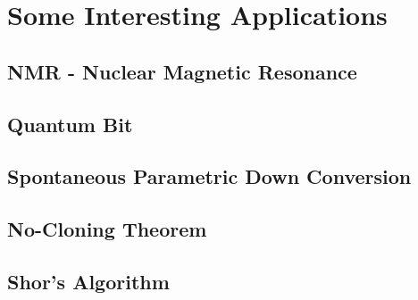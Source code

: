 \documentclass[../../Quantum-Technologies-Notes]{subfiles}
\begin{document}
	
	\ifSubfilesClassLoaded{ \pagestyle{fancy} }{}
	
	\section{Some Interesting Applications}
		
		\subsection{NMR - Nuclear Magnetic Resonance}
		
		\subsection{Quantum Bit}
			
		
		\subsection{Spontaneous Parametric Down Conversion}
		
		\subsection{No-Cloning Theorem}
		
		\subsection{Shor's Algorithm}
		
		
		
		\pagebreak
\end{document}
